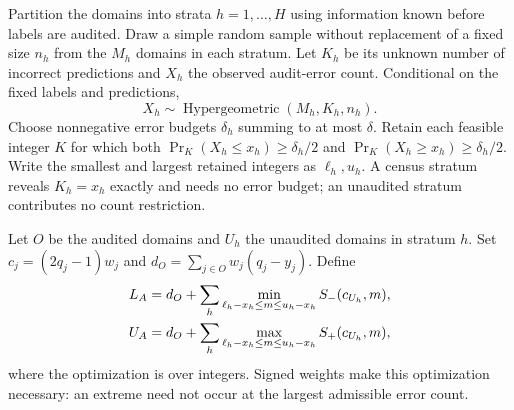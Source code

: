 Partition the domains into strata $h=1,\ldots,H$ using information known before
labels are audited. Draw a simple random sample without replacement of a fixed
size $n_h$ from the $M_h$ domains in each stratum. Let $K_h$ be its unknown
number of incorrect predictions and $X_h$ the observed audit-error count.
Conditional on the fixed labels and predictions,
\begin{equation}
 X_h\sim\operatorname{Hypergeometric}(M_h,K_h,n_h).
\end{equation}
Choose nonnegative error budgets $\delta_h$ summing to at most $\delta$.
Retain each feasible integer $K$ for which both
$\Pr_K(X_h\leq x_h)\geq\delta_h/2$ and
$\Pr_K(X_h\geq x_h)\geq\delta_h/2$.
Write the smallest and largest retained integers as $\ell_h,u_h$.
A census stratum reveals $K_h=x_h$ exactly and needs no error budget; an
unaudited stratum contributes no count restriction.

Let $O$ be the audited domains and $U_h$ the unaudited domains in stratum $h$.
Set $c_j=(2q_j-1)w_j$ and
$d_O=\sum_{j\in O}w_j(q_j-y_j)$. Define
\begin{align}
 L_A&=d_O+\sum_h\min_{\ell_h-x_h\leq m\leq u_h-x_h}
                 S_-(c_{U_h},m),\notag\\
 U_A&=d_O+\sum_h\max_{\ell_h-x_h\leq m\leq u_h-x_h}
                 S_+(c_{U_h},m),\label{eq:auditbounds}
\end{align}
where the optimization is over integers. Signed weights make this optimization
necessary: an extreme need not occur at the largest admissible error count.

